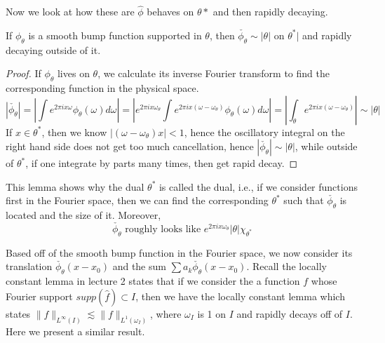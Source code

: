 Now we look at how these are $\widehat{\phi}$ behaves on $\theta*$ and then rapidly decaying. 
\begin{lemma}
    If $\phi_\theta$ is a smooth bump function supported in $\theta$, then $\check{\phi_\theta}\sim|\theta|$ on $\theta^*|$ and rapidly decaying outside of it.
\end{lemma}
\begin{proof}
    If $\phi_\theta$ lives on $\theta$, we calculate its inverse Fourier transform to find the corresponding function in the physical space. 
    \begin{equation*}
        |\check{\phi_\theta}|=\left|\int e^{2\pi ix\omega}\phi_\theta(\omega)d\omega \right|=\left|e^{2\pi ix\omega_\theta}\int e^{2\pi ix(\omega-\omega_\theta)}\phi_\theta(\omega)d\omega \right|=\left|\int_\theta e^{2\pi ix(\omega-\omega_\theta)} \right| \sim |\theta|
    \end{equation*}
    If $x\in\theta^*$, then we know $|(\omega-\omega_\theta)x|<1$, hence the oscillatory integral on the right hand side does not get too much cancellation, hence $|\check{\phi_\theta}|\sim|\theta|$, while outside of $\theta^*$, if one integrate by parts many times, then get rapid decay.
\end{proof}
\begin{remark}
    This lemma shows why the dual $\theta^*$ is called the dual, i.e., if we consider functions first in the Fourier space, then we can find the corresponding $\theta^*$ such that $\check{\phi_\theta}$ is located and the size of it. Moreover, 
    \begin{equation*}
        \check{\phi_\theta} \text{ roughly looks like } e^{2\pi i x\omega_\theta}|\theta|\chi_{\theta^*}
    \end{equation*}
\end{remark}

Based off of the smooth bump function in the Fourier space, we now consider its translation $\check{\phi_\theta}(x-x_0)$ and the sum $\sum a_k\check{\phi_\theta}(x-x_0)$. Recall the locally constant lemma in lecture 2 states that if we consider the a function $f$ whose Fourier support $supp (\widehat{f})\subset I$, then we have the locally constant lemma which states $\|f\|_{L^\infty(I)}\lesssim \|f\|_{L^1(\omega_I)}$, where $\omega_I$ is 1 on $I$ and rapidly decays off of $I$. Here we present a similar result.

